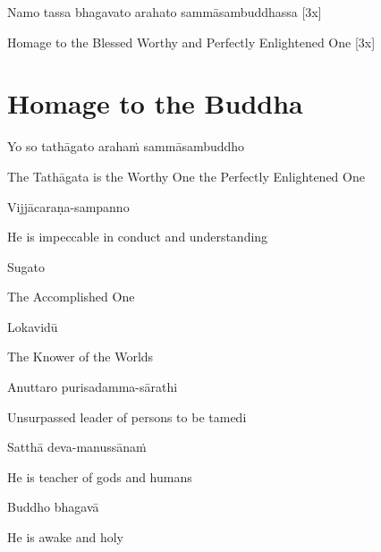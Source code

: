 Namo tassa bhagavato arahato sammāsambuddhassa [3x]

\begin{cprenglish}
  Homage to the Blessed Worthy and Perfectly Enlightened One [3x]
\end{cprenglish}

\clearpage

\section{Homage to the Buddha}

\begin{leader}
\end{leader}
\begin{leader}
\end{leader}

Yo so tathāgato arahaṁ sammāsambuddho

\begin{cprenglish}
  The Tathāgata is the Worthy One the Perfectly Enlightened One
\end{cprenglish}

Vijjācaraṇa-sampanno

\begin{cprenglish}
  He is impeccable in conduct and understanding
\end{cprenglish}

Sugato

\begin{cprenglish}
  The Accomplished One
\end{cprenglish}

Lokavidū

\begin{cprenglish}
  The Knower of the Worlds
\end{cprenglish}

Anuttaro purisadamma-sārathi

\begin{cprenglish}
  Unsurpassed leader of persons to be tamedi
\end{cprenglish}

Satthā deva-manussānaṁ

\begin{cprenglish}
  He is teacher of gods and humans
\end{cprenglish}

Buddho bhagavā

\begin{cprenglish}
  He is awake and holy
\end{cprenglish}

